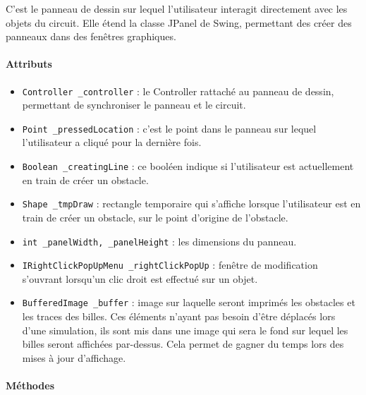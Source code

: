 \documentclass{report}
\begin{document}
C'est le panneau de dessin sur lequel l'utilisateur interagit directement avec les objets du circuit. Elle étend la classe JPanel de Swing, permettant des créer des panneaux dans des fenêtres graphiques.

\paragraph*{Attributs}

\begin{itemize}
\item \texttt{Controller \_controller} : le Controller rattaché au panneau de dessin, permettant de synchroniser le panneau et le circuit.
\item \texttt{Point \_pressedLocation} : c'est le point dans le panneau sur lequel l'utilisateur a cliqué pour la dernière fois.
\item \texttt{Boolean \_creatingLine} : ce booléen indique si l'utilisateur est actuellement en train de créer un obstacle.
\item \texttt{Shape \_tmpDraw} : rectangle temporaire qui s'affiche lorsque l'utilisateur est en train de créer un obstacle, sur le point d'origine de l'obstacle.
\item \texttt{int \_panelWidth, \_panelHeight} : les dimensions du panneau.
\item \texttt{IRightClickPopUpMenu \_rightClickPopUp} : fenêtre de modification s'ouvrant lorsqu'un clic droit est effectué sur un objet.
\item \texttt{BufferedImage \_buffer} : image sur laquelle seront imprimés les obstacles et les traces des billes. Ces éléments n'ayant pas besoin d'être déplacés lors d'une simulation, ils sont mis dans une image qui sera le fond sur lequel les billes seront affichées par-dessus. Cela permet de gagner du temps lors des mises à jour d'affichage.
\end{itemize}

\paragraph*{Méthodes}
\end{document}
